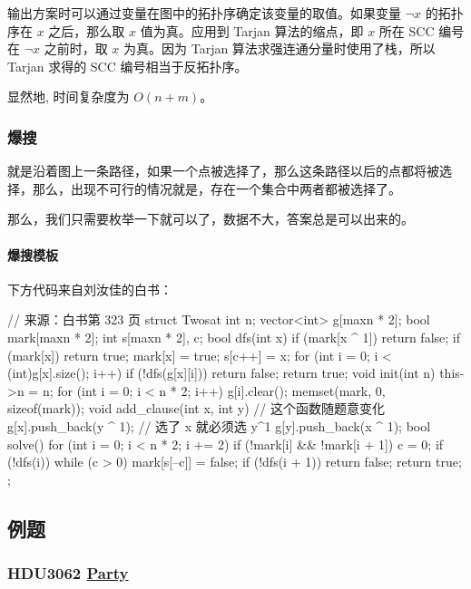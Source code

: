 输出方案时可以通过变量在图中的拓扑序确定该变量的取值。如果变量 $\neg x$ 的拓扑序在 $x$ 之后，那么取 $x$ 值为真。应用到 Tarjan 算法的缩点，即 $x$ 所在 SCC 编号在 $\neg x$ 之前时，取 $x$ 为真。因为 Tarjan 算法求强连通分量时使用了栈，所以 Tarjan 求得的 SCC 编号相当于反拓扑序。

显然地, 时间复杂度为 $O(n+m)$。

\subsubsection{爆搜}

就是沿着图上一条路径，如果一个点被选择了，那么这条路径以后的点都将被选择，那么，出现不可行的情况就是，存在一个集合中两者都被选择了。

那么，我们只需要枚举一下就可以了，数据不大，答案总是可以出来的。

\paragraph{爆搜模板}

下方代码来自刘汝佳的白书：

\begin{cppcode}
// 来源：白书第 323 页
struct Twosat {
  int n;
  vector<int> g[maxn * 2];
  bool mark[maxn * 2];
  int s[maxn * 2], c;
  bool dfs(int x) {
    if (mark[x ^ 1]) return false;
    if (mark[x]) return true;
    mark[x] = true;
    s[c++] = x;
    for (int i = 0; i < (int)g[x].size(); i++)
      if (!dfs(g[x][i])) return false;
    return true;
  }
  void init(int n) {
    this->n = n;
    for (int i = 0; i < n * 2; i++) g[i].clear();
    memset(mark, 0, sizeof(mark));
  }
  void add_clause(int x, int y) {  // 这个函数随题意变化
    g[x].push_back(y ^ 1);         // 选了 x 就必须选 y^1
    g[y].push_back(x ^ 1);
  }
  bool solve() {
    for (int i = 0; i < n * 2; i += 2)
      if (!mark[i] && !mark[i + 1]) {
        c = 0;
        if (!dfs(i)) {
          while (c > 0) mark[s[--c]] = false;
          if (!dfs(i + 1)) return false;
        }
      }
    return true;
  }
};
\end{cppcode}

\subsection{例题}

\subsubsection{\textbf{HDU3062 \href{http://acm.hdu.edu.cn/showproblem.php?pid=3062}{Party}}}


